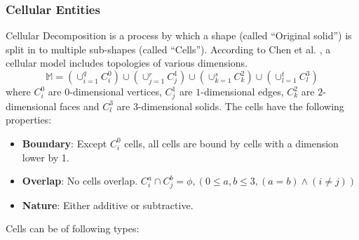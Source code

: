 \subsubsection{Cellular Entities}
Cellular Decomposition is a process by which a shape (called ``Original solid'') is split in to multiple sub-shapes (called ``Cells'').   According to Chen et al. \cite{Chen2006}, a cellular model includes topologies of various dimensions. 
$$\mathbb{M} = 
(\cup_{i=1}^{q} C_i^0 ) \cup 
(\cup_{j=1}^{r} C_j^1 ) \cup  
(\cup_{k=1}^{s} C_k^2 ) \cup 
(\cup_{l=1}^{t} C_l^3 ) $$ where  $C_i^0$ are $0$-dimensional vertices,  $C_j^1$ are $1$-dimensional edges,  $C_k^2$ are $2$-dimensional faces and  $C_l^3$ are $3$-dimensional solids. The cells have the following properties: 
	\begin{itemize}[noitemsep,topsep=2pt,parsep=2pt,partopsep=2pt]
	\item \textbf{Boundary}: Except $C_i^0$ cells, all cells are bound by cells with a dimension lower by 1.
	\item \textbf{Overlap}: No cells overlap.
	$C_i^a \cap C_j^b = \phi, ( 0 \leq a, b \leq 3, (a = b) \wedge ( i \neq j ))$
	\item \textbf{Nature}: Either  additive  or  subtractive.
	\end{itemize}

Cells can be of following types:

